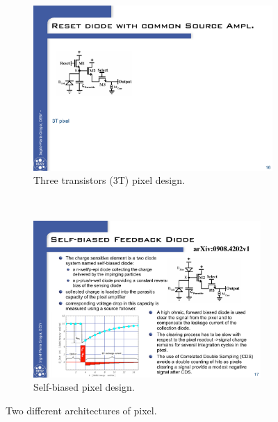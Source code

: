     \begin{figure}[!h]
    \centering
    \begin{subfigure}[t]{0.45\textwidth}
        \includegraphics[width=\textwidth]{Pictures/vxd/3T_architecture.pdf}
        \caption{Three transistors (3T) pixel design.}
        \label{fig:3T}
    \end{subfigure}
    ~%
    \begin{subfigure}[t]{0.45\textwidth}
        \includegraphics[width=0.95\textwidth]{Pictures/vxd/self-biased_architecture.pdf}
        \caption{Self-biased pixel design.}
        \label{fig:selfBiased}
    \end{subfigure}
      \caption{Two different architectures of pixel.}
      \label{fig:elecArch}
    \end{figure}    

